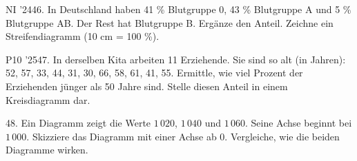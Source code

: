 \documentclass[11pt]{article}
\begin{document}
\pfgruppe{}
\begin{pfaufg}{NI ’24}{46.}{}
In Deutschland haben 41 \% Blutgruppe 0, 43 \% Blutgruppe A und 5 \% Blutgruppe AB. Der Rest hat Blutgruppe B. Ergänze den Anteil. Zeichne ein Streifendiagramm (10 cm = 100 \%).
\par\smallskip\noindent {}
\par\smallskip\noindent {}\par
{}
\end{pfaufg}
\pfgruppe{}
\begin{pfaufg}{P10 ’25}{47.}{}
In derselben Kita arbeiten 11 Erziehende. Sie sind so alt (in Jahren): 52, 57, 33, 44, 31, 30, 66, 58, 61, 41, 55. Ermittle, wie viel Prozent der Erziehenden jünger als 50 Jahre sind. Stelle diesen Anteil in einem Kreisdiagramm dar.
\par\smallskip\noindent \kreisleer[2.5]\par
{}
\end{pfaufg}
\pfgruppe{}
\begin{pfaufg}{}{48.}{}
Ein Diagramm zeigt die Werte $1\,020$, $1\,040$ und $1\,060$. Seine Achse beginnt bei $1\,000$. Skizziere das Diagramm mit einer Achse ab $0$. Vergleiche, wie die beiden Diagramme wirken.
\par\smallskip\noindent {}\par
{}
\end{pfaufg}
\pfgruppe{}
\end{document}

